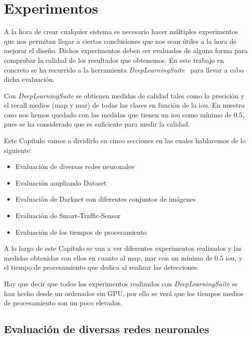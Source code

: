\chapter{Experimentos}\label{cap.experimentos}

A la hora de crear cualquier sistema es necesario hacer múltiples experimentos que nos permitan llegar a ciertas conclusiones que nos sean útiles a la hora de mejorar el diseño. Dichos experimentos deben ser evaluados de alguna forma para comprobar la calidad de los resultados que obtenemos. En este trabajo en concreto se ha recurrido a la herramienta \textit{DeepLearningSuite}~\cite{detectionsuite} para llevar a cabo dicha evaluación.

Con \textit{DeepLearningSuite} se obtienen medidas de calidad tales como la precición y el recall medios (\acrshort{map} y \acrshort{mar}) de todas las clases en función de la \acrfull{iou}. En nuestro caso nos hemos quedado con las medidas que tienen un \acrshort{iou} como mínimo de 0.5, pues se ha considerado que es suficiente para medir la calidad.

Este Capítulo vamos a dividirlo en cinco secciones en las cuales hablaremos de lo siguiente:
\begin{itemize}
    \item Evaluación de diversas redes neuronales
    \item Evaluación ampliando Dataset
    \item Evaluación de Darknet con diferentes conjuntos  de imágenes
    \item Evaluación de Smart-Traffic-Sensor
    \item Evaluación de los tiempos de procesamiento
\end{itemize}

A lo largo de este Capítulo se van a ver diferentes experimentos realizados y las medidas obtenidas con ellos en cuanto al \acrfull{map}, \acrfull{mar} con un mínimo de 0.5 \acrshort{iou}, y el tiempo de procesamiento que dedica al realizar las detecciones.

Hay que decir que todos los experimentos realizados con \textit{DeepLearningSuite} se han hecho desde un ordenador sin GPU, por ello se verá que los tiempos medios de procesamiento son un poco elevados.

\section{Evaluación de diversas redes neuronales}
 
